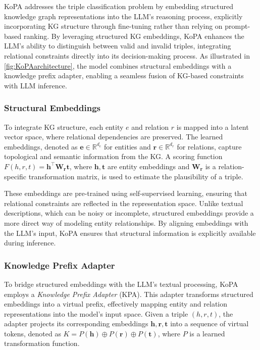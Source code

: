 \documentclass[12pt,a4paper]{article}
\begin{document}
KoPA addresses the triple classification problem by embedding structured knowledge graph representations into the LLM’s reasoning process, explicitly incorporating KG structure through fine-tuning rather than relying on prompt-based ranking.
By leveraging structured KG embeddings, KoPA enhances the LLM’s ability to distinguish between valid and invalid triples, integrating relational constraints directly into its decision-making process.
As illustrated in \cref{fig:KoPAarchitecture}, the model combines structural embeddings with a knowledge prefix adapter, enabling a seamless fusion of KG-based constraints with LLM inference.

\subsubsection{Structural Embeddings}
To integrate KG structure, each entity \( e \) and relation \( r \) is mapped into a latent vector space, where relational dependencies are preserved. The learned embeddings, denoted as \( \mathbf{e} \in \mathbb{R}^{d_e} \) for entities and \( \mathbf{r} \in \mathbb{R}^{d_r} \) for relations, capture topological and semantic information from the KG. A scoring function \( F(h, r, t) = \mathbf{h}^\top \mathbf{W_r} \mathbf{t} \), where \( \mathbf{h}, \mathbf{t} \) are entity embeddings and \( \mathbf{W_r} \) is a relation-specific transformation matrix, is used to estimate the plausibility of a triple.

These embeddings are pre-trained using self-supervised learning, ensuring that relational constraints are reflected in the representation space.
Unlike textual descriptions, which can be noisy or incomplete, structured embeddings provide a more direct way of modeling entity relationships.
By aligning embeddings with the LLM’s input, KoPA ensures that structural information is explicitly available during inference.

\subsubsection{Knowledge Prefix Adapter}

To bridge structured embeddings with the LLM’s textual processing, KoPA employs a \textit{Knowledge Prefix Adapter} (KPA). This adapter transforms structured embeddings into a virtual prefix, effectively mapping entity and relation representations into the model’s input space. Given a triple \( (h, r, t) \), the adapter projects its corresponding embeddings \( \mathbf{h}, \mathbf{r}, \mathbf{t} \) into a sequence of virtual tokens, denoted as \( K = P(\mathbf{h}) \oplus P(\mathbf{r}) \oplus P(\mathbf{t}) \), where \( P \) is a learned transformation function.
\end{document}
